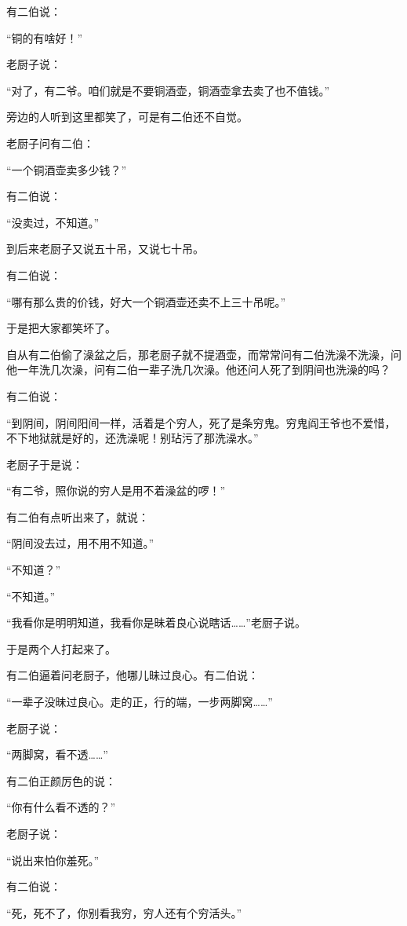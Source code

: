 \par 有二伯说：
\par “铜的有啥好！”
\par 老厨子说：
\par “对了，有二爷。咱们就是不要铜酒壶，铜酒壶拿去卖了也不值钱。”
\par 旁边的人听到这里都笑了，可是有二伯还不自觉。
\par 老厨子问有二伯：
\par “一个铜酒壶卖多少钱？”
\par 有二伯说：
\par “没卖过，不知道。”
\par 到后来老厨子又说五十吊，又说七十吊。
\par 有二伯说：
\par “哪有那么贵的价钱，好大一个铜酒壶还卖不上三十吊呢。”
\par 于是把大家都笑坏了。
\par 自从有二伯偷了澡盆之后，那老厨子就不提酒壶，而常常问有二伯洗澡不洗澡，问他一年洗几次澡，问有二伯一辈子洗几次澡。他还问人死了到阴间也洗澡的吗？
\par 有二伯说：
\par “到阴间，阴间阳间一样，活着是个穷人，死了是条穷鬼。穷鬼阎王爷也不爱惜，不下地狱就是好的，还洗澡呢！别玷污了那洗澡水。”
\par 老厨子于是说：
\par “有二爷，照你说的穷人是用不着澡盆的啰！”
\par 有二伯有点听出来了，就说：
\par “阴间没去过，用不用不知道。”
\par “不知道？”
\par “不知道。”
\par “我看你是明明知道，我看你是昧着良心说瞎话……”老厨子说。
\par 于是两个人打起来了。
\par 有二伯逼着问老厨子，他哪儿昧过良心。有二伯说：
\par “一辈子没昧过良心。走的正，行的端，一步两脚窝……”
\par 老厨子说：
\par “两脚窝，看不透……”
\par 有二伯正颜厉色的说：
\par “你有什么看不透的？”
\par 老厨子说：
\par “说出来怕你羞死。”
\par 有二伯说：
\par “死，死不了，你别看我穷，穷人还有个穷活头。”
